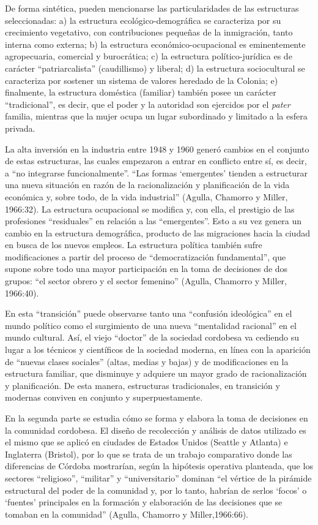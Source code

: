 De forma sintética, pueden mencionarse las particularidades de las estructuras seleccionadas: a) la estructura ecológico-demográfica se caracteriza por su crecimiento vegetativo, con contribuciones pequeñas de la inmigración, tanto interna como externa; b) la estructura económico-ocupacional es eminentemente agropecuaria, comercial y burocrática; c) la estructura político-jurídica es de carácter ``patriarcalista'' (caudillismo) y liberal; d) la estructura sociocultural se caracteriza por sostener un sistema de valores heredado de la Colonia; e) finalmente, la estructura doméstica (familiar) también posee un carácter ``tradicional'', es decir, que el poder y la autoridad son ejercidos por el \emph{pater} familia, mientras que la mujer ocupa un lugar subordinado y limitado a la esfera privada.

La alta inversión en la industria entre 1948 y 1960 generó cambios en el conjunto de estas estructuras, las cuales empezaron a entrar en conflicto entre sí, es decir, a ``no integrarse funcionalmente''. ``Las formas `emergentes' tienden a estructurar una nueva situación en razón de la racionalización y planificación de la vida económica y, sobre todo, de la vida industrial'' (Agulla, Chamorro y Miller, 1966:32). La estructura ocupacional se modifica y, con ella, el prestigio de las profesiones ``residuales'' en relación a las ``emergentes''. Esto a su vez genera un cambio en la estructura demográfica, producto de las migraciones hacia la ciudad en busca de los nuevos empleos. La estructura política también sufre modificaciones a partir del proceso de ``democratización fundamental'', que supone sobre todo una mayor participación en la toma de decisiones de dos grupos: ``el sector obrero y el sector femenino'' (Agulla, Chamorro y Miller, 1966:40).

En esta ``transición'' puede observarse tanto una ``confusión ideológica'' en el mundo político como el surgimiento de una nueva ``mentalidad racional'' en el mundo cultural. Así, el viejo ``doctor'' de la sociedad cordobesa va cediendo su lugar a los técnicos y científicos de la sociedad moderna, en línea con la aparición de ``nuevas clases sociales'' (altas, medias y bajas) y de modificaciones en la estructura familiar, que disminuye y adquiere un mayor grado de racionalización y planificación. De esta manera, estructuras tradicionales, en transición y modernas conviven en conjunto y superpuestamente.

En la segunda parte se estudia cómo se forma y elabora la toma de decisiones en la comunidad cordobesa. El diseño de recolección y análisis de datos utilizado es el mismo que se aplicó en ciudades de Estados Unidos (Seattle y Atlanta) e Inglaterra (Bristol), por lo que se trata de un trabajo comparativo donde las diferencias de Córdoba mostrarían, según la hipótesis operativa planteada, que los sectores ``religioso'', ``militar'' y ``universitario'' dominan ``el vértice de la pirámide estructural del poder de la comunidad y, por lo tanto, habrían de serlos `focos' o `fuentes' principales en la formación y elaboración de las decisiones que se tomaban en la comunidad'' (Agulla, Chamorro y Miller,1966:66).

